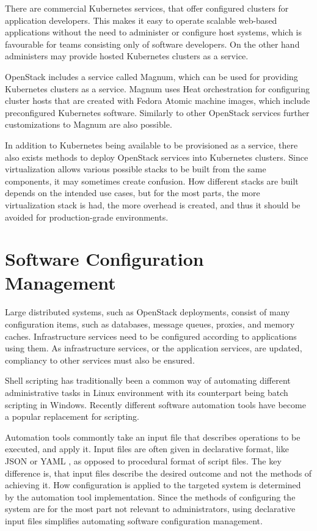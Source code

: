 There are commercial Kubernetes services, that offer configured clusters for
application developers. This makes it easy to operate scalable web-based
applications without the need to administer or configure host systems, which is
favourable for teams consisting only of software developers. On the other hand
administers may provide hosted Kubernetes clusters as a service.

OpenStack includes a service called Magnum, which can be used for providing
Kubernetes clusters as a service. Magnum uses Heat orchestration for
configuring cluster hosts that are created with Fedora Atomic machine images,
which include preconfigured Kubernetes software. Similarly to other OpenStack
services further customizations to Magnum are also possible.

In addition to Kubernetes being available to be provisioned as a service, there
also exists methods to deploy OpenStack services into Kubernetes clusters.
Since virtualization allows various possible stacks to be built from the same
components, it may sometimes create confusion. How different stacks are built
depends on the intended use cases, but for the most parts, the more
virtualization stack is had, the more overhead is created, and thus it should
be avoided for production-grade environments.

\section{Software Configuration Management}

Large distributed systems, such as OpenStack deployments, consist of many
configuration items, such as databases, message queues, proxies, and memory
caches. Infrastructure services need to be configured according to applications
using them. As infrastructure services, or the application services, are
updated, compliancy to other services must also be ensured.

Shell scripting has traditionally been a common way of automating different
administrative tasks in Linux environment with its counterpart being batch
scripting in Windows. Recently different software automation tools have become
a popular replacement for scripting.

Automation tools commontly take an input file that describes operations to be
executed, and apply it. Input files are often given in declarative format, like
JSON \cite{json} or YAML \cite{yaml}, as opposed to procedural format of script
files. The key difference is, that input files describe the desired outcome and
not the methods of achieving it. How configuration is applied to the targeted
system is determined by the automation tool implementation. Since the methods
of configuring the system are for the most part not relevant to administrators,
using declarative input files simplifies automating software configuration
management.


